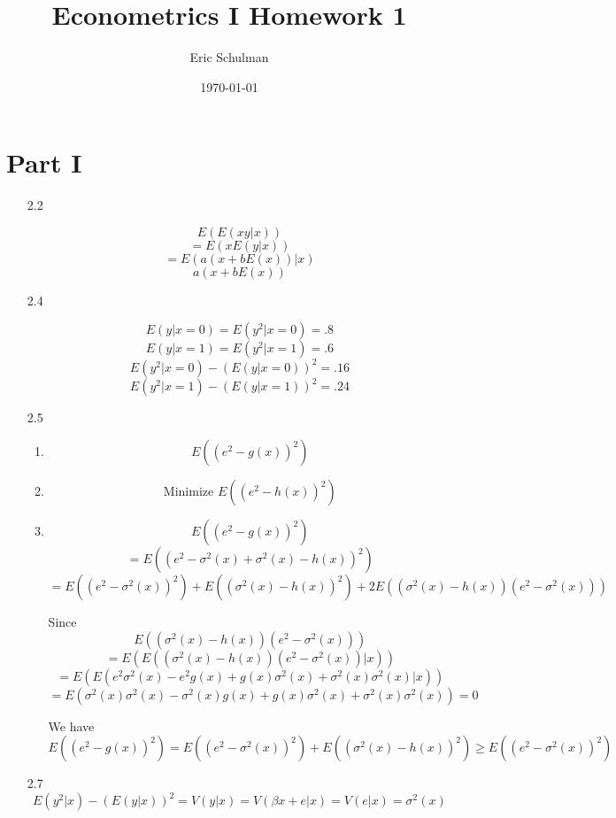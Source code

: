 \documentclass{article}
\title{Econometrics I Homework 1}
\author{Eric Schulman}
\date{\today}
\begin{document}
\maketitle

\section{Part I}

\begin{enumerate}
	\item[2.2] 

	$$E( E(xy | x))$$
	$$ = E( xE(y | x))$$
	$$ = E(a(x+bE(x))|x)$$
	$$a(x+bE(x))$$
	
	\item[2.4]

	$$E(y|x=0) = E(y^2 |x=0)  = .8$$
	$$E(y|x=1) = E(y^2 |x=1)  = .6$$
	$$E(y^2|x=0) - (E(y|x=0))^2 = .16$$
	$$E(y^2|x=1) - (E(y|x=1))^2 = .24$$

	\item[2.5]
	\begin{enumerate} [label=\alph*)]
    	\item 

    	$$E((e^2-g(x))^2)$$
        
        \item 

        $$\text{Minimize } E((e^2-h(x))^2)$$
        
        \item 

        $$E((e^2-g(x))^2)$$
        $$ = E((e^2-\sigma^2(x) + \sigma^2(x) - h(x))^2)$$
        $$ = E((e^2-\sigma^2(x))^2) + E((\sigma^2(x) -h(x))^2) + 2E((\sigma^2(x) -h(x))(e^2-\sigma^2(x)))$$

        Since $$E((\sigma^2(x) -h(x))(e^2-\sigma^2(x)))$$
        $$ = E(E((\sigma^2(x) -h(x))(e^2-\sigma^2(x))|x))$$
        $$ = E(E(e^2\sigma^2(x) - e^2g(x) + g(x)\sigma^2(x) +\sigma^2(x) \sigma^2(x)|x))$$
        $$ = E(\sigma^2(x)\sigma^2(x) - \sigma^2(x)g(x) + g(x)\sigma^2(x) +\sigma^2(x) \sigma^2(x)) = 0$$

        We have
        $$E((e^2-g(x))^2) = E((e^2-\sigma^2(x))^2) + E((\sigma^2(x) -h(x))^2) \geq E((e^2-\sigma^2(x))^2) $$
    
    \end{enumerate} 

    \item[2.7]
    $$E(y^2|x) - (E(y|x))^2 = V(y|x) = V(\beta x + e |x) = V(e|x) = \sigma^2(x)$$


\end{enumerate}
\end{document}
